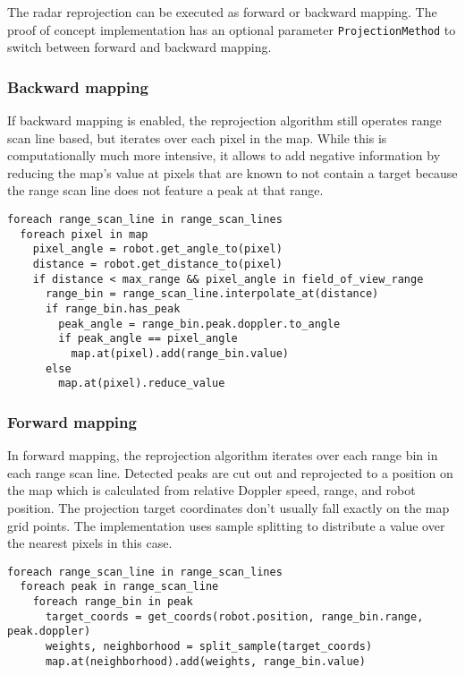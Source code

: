 The radar reprojection can be executed as forward or backward mapping.
The proof of concept implementation has an optional parameter
\texttt{ProjectionMethod} to switch between forward and backward
mapping.

\subsubsection{Backward mapping}\label{backward-mapping}

If backward mapping is enabled, the reprojection algorithm still
operates range scan line based, but iterates over each pixel in the map.
While this is computationally much more intensive, it allows to add
negative information by reducing the map's value at pixels that are
known to not contain a target because the range scan line does not
feature a peak at that range.

\begin{verbatim}
foreach range_scan_line in range_scan_lines
  foreach pixel in map
    pixel_angle = robot.get_angle_to(pixel)
    distance = robot.get_distance_to(pixel)
    if distance < max_range && pixel_angle in field_of_view_range
      range_bin = range_scan_line.interpolate_at(distance)
      if range_bin.has_peak
        peak_angle = range_bin.peak.doppler.to_angle
        if peak_angle == pixel_angle
          map.at(pixel).add(range_bin.value)
      else
        map.at(pixel).reduce_value
\end{verbatim}

\subsubsection{Forward mapping}\label{forward-mapping}

In forward mapping, the reprojection algorithm iterates over each range
bin in each range scan line. Detected peaks are cut out and reprojected
to a position on the map which is calculated from relative Doppler
speed, range, and robot position. The projection target coordinates
don't usually fall exactly on the map grid points. The implementation
uses sample splitting to distribute a value over the nearest pixels in
this case.

\begin{verbatim}
foreach range_scan_line in range_scan_lines
  foreach peak in range_scan_line
    foreach range_bin in peak
      target_coords = get_coords(robot.position, range_bin.range, peak.doppler)
      weights, neighborhood = split_sample(target_coords)
      map.at(neighborhood).add(weights, range_bin.value)
\end{verbatim}

